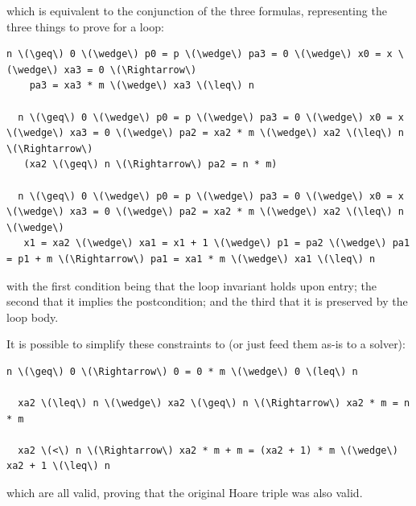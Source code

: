 \newpage
which is equivalent to the conjunction of the three formulas, representing the three things to prove for a loop:
\begin{Verbatim}[commandchars=\\\{\}]
  n \(\geq\) 0 \(\wedge\) p0 = p \(\wedge\) pa3 = 0 \(\wedge\) x0 = x \(\wedge\) xa3 = 0 \(\Rightarrow\)
    pa3 = xa3 * m \(\wedge\) xa3 \(\leq\) n

  n \(\geq\) 0 \(\wedge\) p0 = p \(\wedge\) pa3 = 0 \(\wedge\) x0 = x \(\wedge\) xa3 = 0 \(\wedge\) pa2 = xa2 * m \(\wedge\) xa2 \(\leq\) n \(\Rightarrow\)
   (xa2 \(\geq\) n \(\Rightarrow\) pa2 = n * m)

  n \(\geq\) 0 \(\wedge\) p0 = p \(\wedge\) pa3 = 0 \(\wedge\) x0 = x \(\wedge\) xa3 = 0 \(\wedge\) pa2 = xa2 * m \(\wedge\) xa2 \(\leq\) n \(\wedge\)
   x1 = xa2 \(\wedge\) xa1 = x1 + 1 \(\wedge\) p1 = pa2 \(\wedge\) pa1 = p1 + m \(\Rightarrow\) pa1 = xa1 * m \(\wedge\) xa1 \(\leq\) n
\end{Verbatim}
with the first condition being that the loop invariant holds upon entry; the second that it implies the postcondition; and the third that it is preserved by the loop body.

It is possible to simplify these constraints to (or just feed them as-is to a solver):
\begin{Verbatim}[commandchars=\\\{\}]
  n \(\geq\) 0 \(\Rightarrow\) 0 = 0 * m \(\wedge\) 0 \(leq\) n

  xa2 \(\leq\) n \(\wedge\) xa2 \(\geq\) n \(\Rightarrow\) xa2 * m = n * m

  xa2 \(<\) n \(\Rightarrow\) xa2 * m + m = (xa2 + 1) * m \(\wedge\) xa2 + 1 \(\leq\) n
\end{Verbatim}
which are all valid, proving that the original Hoare triple was also valid.

